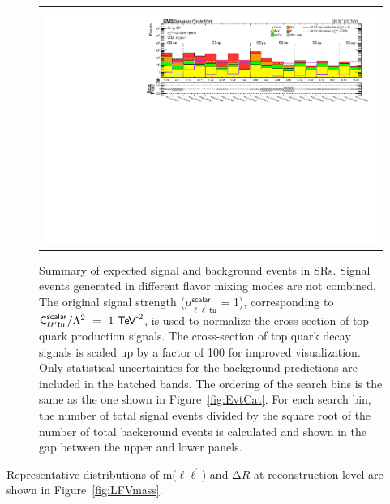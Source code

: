 \begin{figure}[tbh!]
 \begin{center}
 \begin{tabular}{c}
 \includegraphics[width=\textwidth]{figures/Part4/Evt/Summary_llOffZMetg20B1}
 \end{tabular}
 \caption{Summary of expected signal and background events in \acp{SR}. Signal events generated in different flavor mixing modes are not combined. The original signal strength ($\mu_{\ell\ell^{\prime}\textsf{tu}}^{\textsf{scalar}}$ = 1), corresponding to $\textsf{C}_{\ell\ell^{\prime}\textsf{tu}}^{\textsf{scalar}}/\mathrm{\Lambda}^2~=~1~\textsf{TeV}^{\textsf{-2}}$, is used to normalize the cross-section of top quark production signals. The cross-section of top quark decay signals is scaled up by a factor of 100 for improved visualization. Only statistical uncertainties for the background predictions are included in the hatched bands. The ordering of the search bins is the same as the one shown in Figure~\ref{fig:EvtCat}. For each search bin, the number of total signal events divided by the square root of the number of total background events is calculated and shown in the gap between the upper and lower panels.}
 \label{fig:Summary}
 \end{center}
 \end{figure}
 
Representative distributions of m($\ell\ell^{\prime}$) and $\mathrm{\Delta}R$ at reconstruction level are shown in Figure~\ref{fig:LFVmass}.
 
